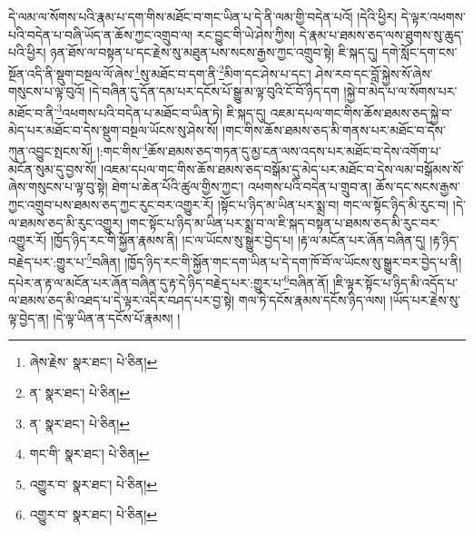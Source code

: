 དེ་ལམ་ལ་སོགས་པའི་རྣམ་པ་དག་གིས་མཐོང་བ་གང་ཡིན་པ་དེ་ནི་ལམ་གྱི་བདེན་པའོ། །དེའི་ཕྱིར། དེ་ལྟར་འཕགས་པའི་བདེན་པ་བཞི་ཡོད་ན་ཆོས་ཀྱང་འགྲུབ་ལ། རང་བྱུང་གི་ཡེ་ཤེས་ཀྱིས། དེ་རྣམ་པ་ཐམས་ཅད་ལས་ཐུགས་སུ་ཆུད་པའི་ཕྱིར། ཉན་ཐོས་ལ་བསྟན་པ་དང་རྗེས་སུ་མཐུན་པས་སངས་རྒྱས་ཀྱང་འགྲུབ་སྟེ། ཇི་སྐད་དུ། དགེ་སློང་དག་ངས་སྔོན་འདི་ནི་སྡུག་བསྔལ་ལོ་ཞེས་\footnote{ཞེས་རྗེས་  སྣར་ཐང་།  པེ་ཅིན། }སུ་མཐོང་བ་དག་ནི་\footnote{ན་  སྣར་ཐང་།  པེ་ཅིན། }མིག་དང་ཤེས་པ་དང་། ཤེས་རབ་དང་བློ་སྐྱེས་སོ་ཞེས་གསུངས་པ་ལྟ་བུའོ། །དེ་བཞིན་དུ་དོན་དམ་པར་དངོས་པོ་སྒྱུ་མ་ལྟ་བུའི་ངོ་བོ་ཉིད་དག །སྐྱེ་བ་མེད་པ་ལ་སོགས་པར་མཐོང་བ་ནི་\footnote{ན་  སྣར་ཐང་།  པེ་ཅིན། }འཕགས་པའི་བདེན་པ་མཐོང་བ་ཡིན་ཏེ། ཇི་སྐད་དུ། འཇམ་དཔལ་གང་གིས་ཆོས་ཐམས་ཅད་སྐྱེ་བ་མེད་པར་མཐོང་བ་དེས་སྡུག་བསྔལ་ཡོངས་སུ་ཤེས་སོ། །གང་གིས་ཆོས་ཐམས་ཅད་མི་གནས་པར་མཐོང་བ་དེས་ཀུན་འབྱུང་སྤངས་སོ། །:གང་གིས་\footnote{གང་གི་  སྣར་ཐང་།  པེ་ཅིན། }ཆོས་ཐམས་ཅད་གཏན་དུ་མྱ་ངན་ལས་འདས་པར་མཐོང་བ་དེས་འགོག་པ་མངོན་སུམ་དུ་བྱས་སོ། །འཇམ་དཔལ་གང་གིས་ཆོས་ཐམས་ཅད་བསྒོམ་དུ་མེད་པར་མཐོང་བ་དེས་ལམ་བསྒོམས་སོ་ཞེས་གསུངས་པ་ལྟ་བུ་སྟེ། ཐེག་པ་ཆེན་པོའི་ཚུལ་གྱིས་ཀྱང་། འཕགས་པའི་བདེན་པ་གྲུབ་ན། ཆོས་དང་སངས་རྒྱས་ཀྱང་འགྲུབ་པས་ཐམས་ཅད་ཀྱང་རུང་བར་འགྱུར་རོ། །སྟོང་པ་ཉིད་མ་ཡིན་པར་སྨྲ་བ། གང་ལ་སྟོང་ཉིད་མི་རུང་བ། །དེ་ལ་ཐམས་ཅད་མི་རུང་འགྱུར། །གང་སྟོང་པ་ཉིད་མ་ཡིན་པར་སྨྲ་བ་ལ་ཇི་སྐད་བསྟན་པ་ཐམས་ཅད་མི་རུང་བར་འགྱུར་རོ། །ཁྱོད་ཉིད་རང་གི་སྐྱོན་རྣམས་ནི། །ང་ལ་ཡོངས་སུ་སྒྱུར་བྱེད་པ། །རྟ་ལ་མངོན་པར་ཞོན་བཞིན་དུ། །རྟ་ཉིད་བརྗེད་པར་:གྱུར་པ་\footnote{འགྱུར་བ་  སྣར་ཐང་།  པེ་ཅིན། }བཞིན། །ཁྱོད་ཉིད་རང་གི་སྐྱོན་གང་དག་ཡིན་པ་དེ་དག་ཁོ་བོ་ལ་ཡོངས་སུ་སྒྱུར་བར་བྱེད་པ་ནི། དཔེར་ན་རྟ་ལ་མངོན་པར་ཞོན་བཞིན་དུ་རྟ་དེ་ཉིད་བརྗེད་པར་:གྱུར་པ་\footnote{འགྱུར་བ་  སྣར་ཐང་།  པེ་ཅིན། }བཞིན་ནོ། །ཇི་ལྟར་སྟོང་པ་ཉིད་མི་འདོད་པ་ལ་ཐམས་ཅད་མི་འཐད་པ་དེ་ལྟར་འདིར་བཤད་པར་བྱ་སྟེ། གལ་ཏེ་དངོས་རྣམས་དངོས་ཉིད་ལས། །ཡོད་པར་རྗེས་སུ་ལྟ་བྱེད་ན། །དེ་ལྟ་ཡིན་ན་དངོས་པོ་རྣམས། །
